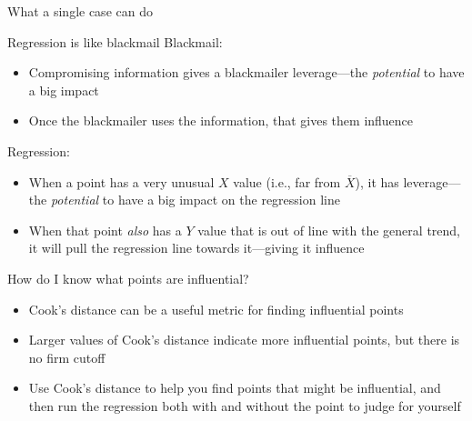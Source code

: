 \documentclass{beamer}\usepackage[]{graphicx}\usepackage[]{color}
\newenvironment{knitrout}{}{} %
\begin{document}
\begin{darkframes}
    \begin{frame}{What a single case can do}
\begin{knitrout}


\end{knitrout}
    \end{frame}

    \begin{frame}
    \end{frame}

    \begin{frame}{Regression is like blackmail}
      Blackmail:
      \begin{itemize}
        \item Compromising information gives a blackmailer \alert{leverage}---the \emph{potential} to have a big impact
        \item Once the blackmailer uses the information, that gives them \alert{influence}
      \end{itemize}
      \pause

      Regression:
      \begin{itemize}
        \item When a point has a very unusual $X$ value (i.e., far from $\overline X$), it has \alert{leverage}---the \emph{potential} to have a big impact on the regression line
        \item When that point \emph{also} has a $Y$ value that is out of line with the general trend, it will pull the regression line towards it---giving it \alert{influence}
      \end{itemize}
    \end{frame}

    \begin{frame}{How do I know what points are influential?}
      \begin{itemize}[<+->]
        \item \alert{Cook's distance} can be a useful metric for finding influential points
        \item Larger values of Cook's distance indicate more influential points, but there is no firm cutoff
        \item Use Cook's distance to help you find points that might be influential, and then run the regression both with and without the point to judge for yourself
      \end{itemize}
    \end{frame}


\end{darkframes}
\end{document}
